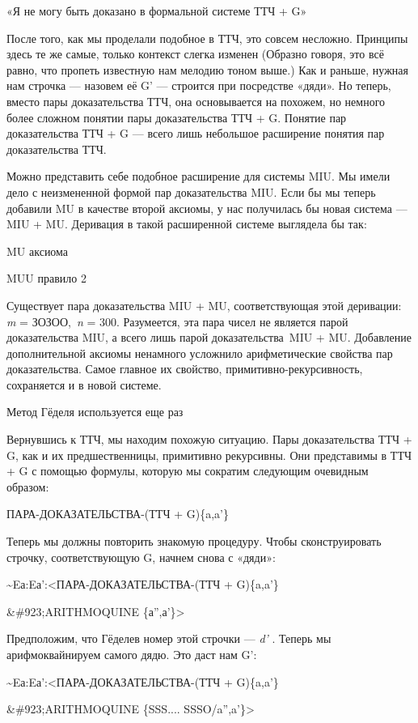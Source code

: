 \documentclass[../main.tex]{subfiles}
\begin{document}
«Я не могу быть доказано в формальной системе ТТЧ + G»

После того, как мы проделали подобное в ТТЧ, это совсем несложно. Принципы здесь те же самые, только контекст слегка изменен (Образно говоря, это всё равно, что пропеть известную нам мелодию тоном выше.) Как и раньше, нужная нам строчка --- назовем её G' --- строится при посредстве «дяди». Но теперь, вместо пары доказательства ТТЧ, она основывается на похожем, но немного более сложном понятии пары доказательства ТТЧ + G. Понятие пар доказательства ТТЧ + G --- всего лишь небольшое расширение понятия пар доказательства ТТЧ.

Можно представить себе подобное расширение для системы MIU. Мы имели дело с неизмененной формой пар доказательства MIU. Если бы мы теперь добавили MU в качестве второй аксиомы, у нас получилась бы новая система --- MIU + MU. Деривация в такой расширенной системе выглядела бы так:

MU аксиома

MUU правило 2

Существует пара доказательства MIU + MU, соответствующая этой деривации: \emph{m} = ЗОЗОО,~\emph{n} = 300. Разумеется, эта пара чисел не является парой доказательства MIU, а всего лишь парой доказательства~MIU + MU. Добавление дополнительной аксиомы ненамного усложнило арифметические свойства пар доказательства. Самое главное их свойство, примитивно-рекурсивность, сохраняется и в новой системе.

Метод Гёделя используется еще раз

Вернувшись к ТТЧ, мы находим похожую ситуацию. Пары доказательства ТТЧ + G, как и их предшественницы, примитивно рекурсивны. Они представимы в ТТЧ + G с помощью формулы, которую мы сократим следующим очевидным образом:

ПАРА-ДОКАЗАТЕЛЬСТВА-(ТТЧ + G)\{a,a'\}

Теперь мы должны повторить знакомую процедуру. Чтобы сконструировать строчку, соответствующую G, начнем снова с «дяди»:

\textasciitilde Eа:Eа':\textless ПАРА-ДОКАЗАТЕЛЬСТВА-(ТТЧ + G)\{a,a'\}

\&\#923;ARITHMOQUINE \{а'',а'\}\textgreater{}

Предположим, что Гёделев номер этой строчки --- \emph{d'} . Теперь мы арифмоквайнируем самого дядю. Это даст нам G':

\textasciitilde Eа:Eа':\textless ПАРА-ДОКАЗАТЕЛЬСТВА-(ТТЧ + G)\{a,a'\}

\&\#923;ARITHMOQUINE \{SSS.... SSSO/a'',a'\}\textgreater{}
\end{document}
